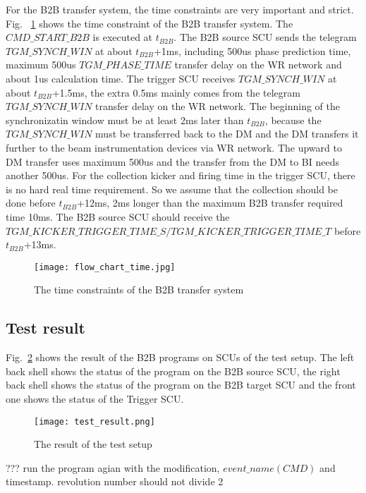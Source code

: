 For the B2B transfer system, the time constraints are very important and strict. Fig. ~\ref{time_constraint} shows the time constraint of the B2B transfer system. The $CMD\_START\_B2B$ is executed at $t_{B2B}$. The B2B source SCU sends the telegram $TGM\_SYNCH\_WIN$ at about $t_{B2B}$+1ms, including 500us phase prediction time, maximum 500us $TGM\_PHASE\_TIME$ transfer delay on the WR network and about 1us calculation time. The trigger SCU receives $TGM\_SYNCH\_WIN$ at about $t_{B2B}$+1.5ms, the extra 0.5ms mainly comes from the telegram $TGM\_SYNCH\_WIN$ transfer delay on the WR network. The beginning of the synchronizatin window must be at least 2ms later than $t_{B2B}$, because the $TGM\_SYNCH\_WIN$ must be transferred back to the DM and the DM transfers it further to the beam instrumentation devices via WR network. The upward to DM transfer uses maximum 500us and the transfer from the DM to BI needs another 500us. For the collection kicker and firing time in the trigger SCU, there is no hard real time requirement. So we assume that the collection should be done before $t_{B2B}$+12ms, 2ms longer than the maximum B2B transfer required time 10ms. The B2B source SCU should receive the $TGM\_KICKER\_ TRIGGER\_ TIME\_ S/ TGM\_KICKER\_ TRIGGER\_ TIME\_ T$ before $t_{B2B}$+13ms.
\begin{figure}[!htb]
   \centering   
   \texttt{[image: flow\_chart\_time.jpg]}
   \caption{The time constraints of the B2B transfer system}
   \label{time_constraint}
\end{figure}



\subsection{Test result}
Fig.~\ref{test_result} shows the result of the B2B programs on SCUs of the test setup. The left back shell shows the status of the program on the B2B source SCU, the right back shell shows the status of the program on the B2B target SCU and the front one shows the status of the Trigger SCU.

\begin{figure}[!htb]
   \centering   
   \texttt{[image: test\_result.png]}
   \caption{The result of the test setup}
   \label{test_result}
\end{figure}
??? run the program agian with the modification, $event\_ name(CMD)$ and timestamp. revolution number should not divide 2


